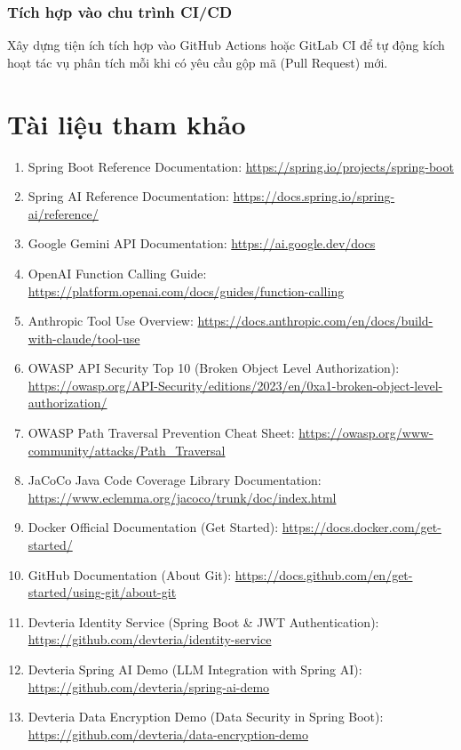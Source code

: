 \documentclass[12pt,a4paper]{report}
\begin{document}
\subsection{Tích hợp vào chu trình CI/CD}
Xây dựng tiện ích tích hợp vào GitHub Actions hoặc GitLab CI để tự động kích hoạt tác vụ phân tích mỗi khi có yêu cầu gộp mã (Pull Request) mới.

\chapter*{Tài liệu tham khảo}

\begin{enumerate}
    \item Spring Boot Reference Documentation: \url{https://spring.io/projects/spring-boot}
    \item Spring AI Reference Documentation: \url{https://docs.spring.io/spring-ai/reference/}
    \item Google Gemini API Documentation: \url{https://ai.google.dev/docs}
    \item OpenAI Function Calling Guide: \url{https://platform.openai.com/docs/guides/function-calling}
    \item Anthropic Tool Use Overview: \url{https://docs.anthropic.com/en/docs/build-with-claude/tool-use}
    \item OWASP API Security Top 10 (Broken Object Level Authorization): \url{https://owasp.org/API-Security/editions/2023/en/0xa1-broken-object-level-authorization/}
    \item OWASP Path Traversal Prevention Cheat Sheet: \url{https://owasp.org/www-community/attacks/Path_Traversal}
    \item JaCoCo Java Code Coverage Library Documentation: \url{https://www.eclemma.org/jacoco/trunk/doc/index.html}
    \item Docker Official Documentation (Get Started): \url{https://docs.docker.com/get-started/}
    \item GitHub Documentation (About Git): \url{https://docs.github.com/en/get-started/using-git/about-git}
    \item Devteria Identity Service (Spring Boot \& JWT Authentication): \url{https://github.com/devteria/identity-service}
    \item Devteria Spring AI Demo (LLM Integration with Spring AI): \url{https://github.com/devteria/spring-ai-demo}
    \item Devteria Data Encryption Demo (Data Security in Spring Boot): \url{https://github.com/devteria/data-encryption-demo}
\end{enumerate}
\end{document}
